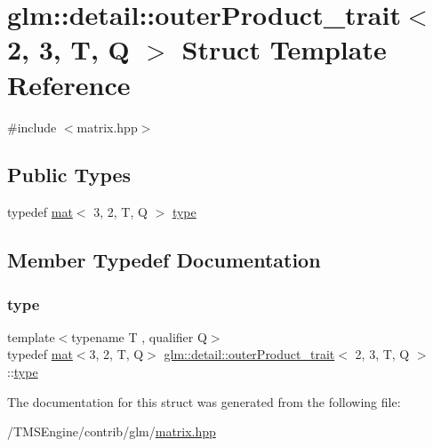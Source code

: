 \hypertarget{structglm_1_1detail_1_1outer_product__trait_3_012_00_013_00_01_t_00_01_q_01_4}{}\section{glm\+:\+:detail\+:\+:outer\+Product\+\_\+trait$<$ 2, 3, T, Q $>$ Struct Template Reference}
\label{structglm_1_1detail_1_1outer_product__trait_3_012_00_013_00_01_t_00_01_q_01_4}


{\ttfamily \#include $<$matrix.\+hpp$>$}

\subsection*{Public Types}
\begin{DoxyCompactItemize}
\item 
typedef \hyperlink{structglm_1_1mat}{mat}$<$ 3, 2, T, Q $>$ \hyperlink{structglm_1_1detail_1_1outer_product__trait_3_012_00_013_00_01_t_00_01_q_01_4_aed11936b8908e00c2e53b98ab9dedd52}{type}
\end{DoxyCompactItemize}


\subsection{Member Typedef Documentation}
\mbox{\label{structglm_1_1detail_1_1outer_product__trait_3_012_00_013_00_01_t_00_01_q_01_4_aed11936b8908e00c2e53b98ab9dedd52}} 
\subsubsection{\texorpdfstring{type}{type}}
{\footnotesize\ttfamily template$<$typename T , qualifier Q$>$ \\
typedef \hyperlink{structglm_1_1mat}{mat}$<$3, 2, T, Q$>$ \hyperlink{structglm_1_1detail_1_1outer_product__trait}{glm\+::detail\+::outer\+Product\+\_\+trait}$<$ 2, 3, T, Q $>$\+::\hyperlink{structglm_1_1detail_1_1outer_product__trait_3_012_00_013_00_01_t_00_01_q_01_4_aed11936b8908e00c2e53b98ab9dedd52}{type}}



The documentation for this struct was generated from the following file\+:\begin{DoxyCompactItemize}
\item 
/\+T\+M\+S\+Engine/contrib/glm/\hyperlink{matrix_8hpp}{matrix.\+hpp}\end{DoxyCompactItemize}
